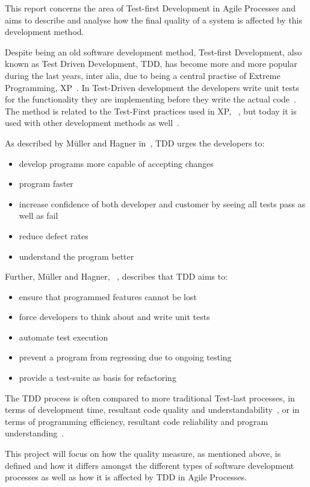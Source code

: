 

This report concerns the area of Test-first Development in Agile Processes and aims to describe and analyse how the final quality of a system is affected by this development method. 

Despite being an old software development method, Test-first Development, also known as Test Driven Development, TDD, has become more and more popular during the last years, inter alia, due to being a central practise of Extreme Programming, XP~\cite{georgeandwilliams}. In Test-Driven development the developers write unit tests for the functionality they are implementing before they write the actual code~\cite{beckTestDriven}. The method is related to the Test-First practices used in XP, ~\cite{beckXP}, but today it is used with other development methods as well~\cite{MSNET}. 

As described by M\"{u}ller and Hagner in~\cite{mullerandhagner}, TDD urges the developers to:
\begin{itemize}
\item	develop programs more capable of accepting changes
\item 	program faster
\item	increase confidence of both developer and customer by seeing all tests pass as well as fail
\item 	reduce defect rates 
\item	understand the program better
\end{itemize}

\noindent Further, M\"{u}ller and Hagner, ~\cite{mullerandhagner}, describes that TDD aims to:
\begin{itemize}
\item 	ensure that programmed features cannot be lost
\item 	force developers to think about and write unit tests 
\item	automate test execution
\item	prevent a program from regressing due to ongoing testing
\item 	provide a test-suite as basis for refactoring
\end{itemize}

\noindent The TDD process is often compared to more traditional Test-last processes, in terms of development time, resultant code quality and understandability~\cite{georgeandwilliams}, or in terms of programming efficiency, resultant code reliability and program understanding~\cite{mullerandhagner}. 

This project will focus on how the quality measure, as mentioned above, is defined and how it differs amongst the different types of software development processes as well as how it is affected by TDD in Agile Processes. 